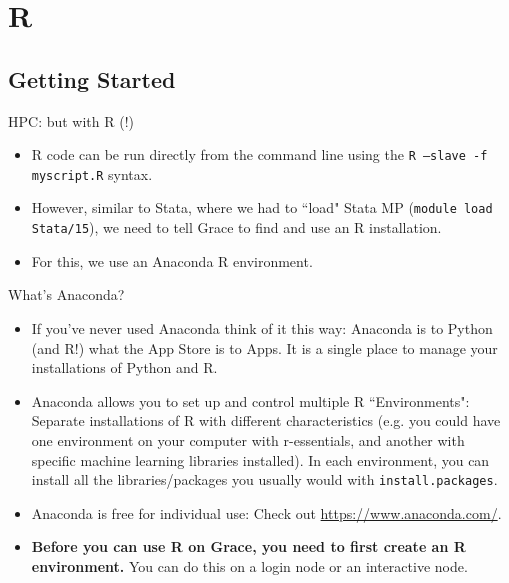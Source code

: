 \documentclass[10pt,xcolor={svgnames}]{beamer}
\begin{document}
\section{R}
\subsection{Getting Started}

\begin{frame}{HPC: but with R (!)}
\begin{itemize}
\item R code can be run directly from the command line using the \texttt{R --slave -f myscript.R} syntax.
\item However, similar to Stata, where we had to ``load" Stata MP (\texttt{module load Stata/15}), we need to tell Grace to find and use an R installation.
\item For this, we use an Anaconda R environment.
\end{itemize}
\end{frame}

\begin{frame}{What's Anaconda?}
\begin{itemize}
\item If you've never used Anaconda think of it this way: Anaconda is to Python (and R!) what the App Store is to Apps. It is a single place to manage your installations of Python and R.
\item Anaconda allows you to set up and control multiple R ``Environments": Separate installations of R with different characteristics (e.g. you could have one environment on your computer with r-essentials, and another with specific machine learning libraries installed). In each environment, you can install all the libraries/packages you usually would with \texttt{install.packages}.
\item Anaconda is free for individual use: Check out \href{https://www.anaconda.com/}{https://www.anaconda.com/}.
\item \textbf{Before you can use R on Grace, you need to first create an R environment.} You can do this on a login node or an interactive node.
\end{itemize}
\end{frame}
\end{document}
